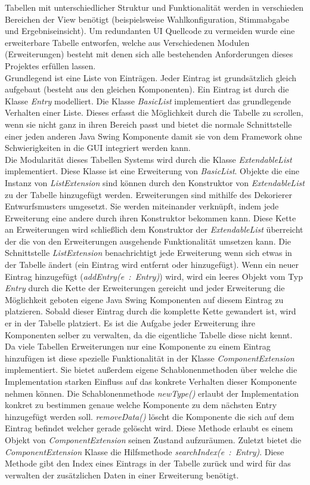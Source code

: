 \documentclass[parskip=full]{scrartcl}
\newcommand{\textitx}[1]{\mbox{\textit{#1}}}
\begin{document}
		Tabellen mit unterschiedlicher Struktur und Funktionalität werden in verschieden Bereichen der View benötigt (beispielsweise Wahlkonfiguration, Stimmabgabe und Ergebniseinsicht). Um redundanten UI Quellcode zu vermeiden wurde eine erweiterbare Tabelle entworfen, welche aus Verschiedenen Modulen (Erweiterungen) besteht mit denen sich alle bestehenden Anforderungen dieses Projektes erfüllen lassen.
		\\
		Grundlegend ist eine Liste von Einträgen. Jeder Eintrag ist grundsätzlich gleich aufgebaut (besteht aus den gleichen Komponenten). Ein Eintrag ist durch die Klasse \textitx{Entry} modelliert. Die Klasse \textitx{BasicList} implementiert das grundlegende Verhalten einer Liste. Dieses erfasst die Möglichkeit durch die Tabelle zu scrollen, wenn sie nicht ganz in ihren Bereich passt und bietet die normale Schnittstelle einer jeden anderen Java Swing Komponente damit sie von dem Framework ohne Schwierigkeiten in die GUI integriert werden kann.
		\\
		Die Modularität dieses Tabellen Systems wird durch die Klasse \textitx{ExtendableList} implementiert. Diese Klasse ist eine Erweiterung von \textitx{BasicList}. Objekte die eine Instanz von \textitx{ListExtension} sind können durch den Konstruktor von \textitx{ExtendableList} zu der Tabelle hinzugefügt werden. Erweiterungen sind mithilfe des Dekorierer Entwurfsmusters umgesetzt. Sie werden miteinander verknüpft, indem jede Erweiterung eine andere durch ihren Konstruktor bekommen kann. Diese Kette an Erweiterungen wird schließlich dem Konstruktor der \textitx{ExtendableList} überreicht der die von den Erweiterungen ausgehende Funktionalität umsetzen kann. Die Schnittstelle \textitx{ListExtension} benachrichtigt jede Erweiterung wenn sich etwas in der Tabelle ändert (ein Eintrag wird entfernt oder hinzugefügt). Wenn ein neuer Eintrag hinzugefügt (\textitx{addEntry(e : Entry)}) wird, wird ein leeres Objekt vom Typ \textitx{Entry} durch die Kette der Erweiterungen gereicht und jeder Erweiterung die Möglichkeit geboten eigene Java Swing Komponenten auf diesem Eintrag zu platzieren. Sobald dieser Eintrag durch die komplette Kette gewandert ist, wird er in der Tabelle platziert. Es ist die Aufgabe jeder Erweiterung ihre Komponenten selber zu verwalten, da die eigentliche Tabelle diese nicht kennt. Da viele Tabellen Erweiterungen nur eine Komponente zu einem Eintrag hinzufügen ist diese spezielle Funktionalität in der Klasse \textitx{ComponentExtension} implementiert. Sie bietet außerdem eigene Schablonenmethoden über welche die Implementation starken Einfluss auf das konkrete Verhalten dieser Komponente nehmen können. Die Schablonenmethode \textitx{newType()} erlaubt der Implementation konkret zu bestimmen genaue welche Komponente zu dem nächsten Entry hinzugefügt werden soll. \textitx{removeData()} löscht die Komponente die sich auf dem Eintrag befindet welcher gerade gelöscht wird. Diese Methode erlaubt es einem Objekt von \textitx{ComponentExtension} seinen Zustand aufzuräumen. Zuletzt bietet die \textitx{ComponentExtension} Klasse die Hilfsmethode \textitx{searchIndex(e : Entry)}. Diese Methode gibt den Index eines Eintrags in der Tabelle zurück und wird für das verwalten der zusätzlichen Daten in einer Erweiterung benötigt.
\end{document}
